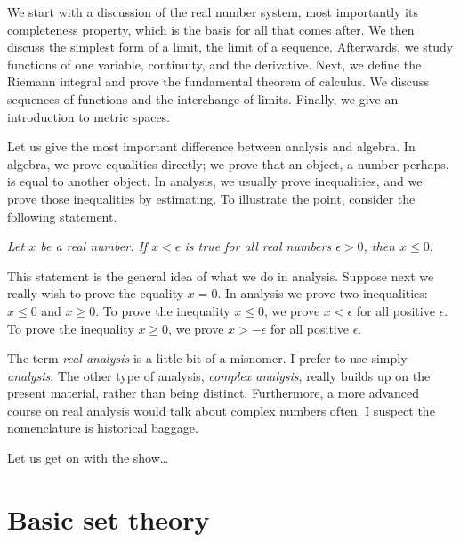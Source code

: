 \medskip

We start with a discussion of the real number system, most importantly
its completeness property, which is the basis for all that comes after.
We then discuss the simplest form of a limit,
the limit of a sequence.  Afterwards, we study
functions of one variable, continuity, and the derivative.
Next, we define the Riemann integral and prove the fundamental theorem of
calculus.  We discuss sequences of functions and the
interchange of limits.  Finally, we give an introduction to metric
spaces.

\medskip

Let us give the most important difference between analysis and algebra.
In algebra, we prove equalities directly;
we prove that an object, a number perhaps, is equal to another object.
In analysis, we usually prove inequalities,
and we prove those inequalities by estimating.
To illustrate the point, consider the following statement.

\medskip

\emph{Let $x$ be a real number.  If $x < \epsilon$ is true for all
real numbers
$\epsilon > 0$, then $x \leq 0$}.

\medskip

This statement is the general idea of what we do in analysis.
Suppose next we really wish to prove the equality
$x = 0$.  In analysis we prove two inequalities:
$x \leq 0$ and $x \geq 0$.
To
prove the inequality
$x \leq 0$, we prove 
$x < \epsilon$ for all positive $\epsilon$.
To
prove the inequality
$x \geq 0$, we prove 
$x > -\epsilon$ for all positive $\epsilon$.

\medskip

The term \emph{real analysis} is a little bit of a misnomer.  I prefer to
use simply \emph{analysis}.  The other type of analysis, 
\emph{complex analysis}, really builds up on the present material, rather than
being distinct.  Furthermore, a more advanced course on real
analysis would talk about complex numbers often.
I suspect the nomenclature is
historical baggage.

\medskip

Let us get on with the show\ldots



\sectionnewpage
\section{Basic set theory} \label{sec:basicset}

